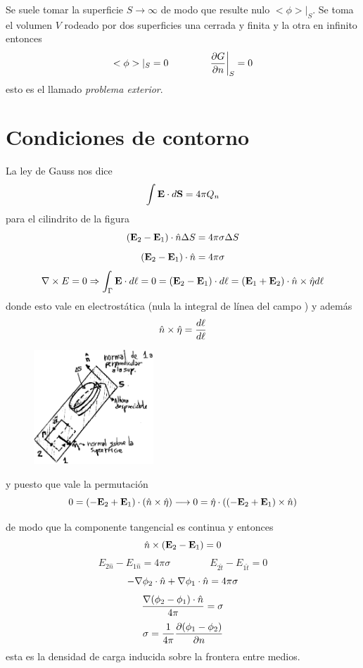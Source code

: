 \documentclass[10pt,oneside]{CBFT_book}
\begin{document}
Se suele tomar la superficie $S \to \infty$ de modo que resulte nulo $<\phi>|_S$.
Se toma el volumen $V$ rodeado por dos superficies una cerrada y finita y la otra
en infinito entonces
\[
	<\phi>|_S = 0 \qquad \qquad \left. \frac{\partial^{\hspace{-0.05em}} {G}}{\partial {n}^{\hspace{-0.05em}}}\right|_S = 0
\]
esto es el llamado {\it problema exterior}.

\section{Condiciones de contorno}

La ley de Gauss nos dice
\[
	\int \vb{E} \cdot d\vb{S} = 4 \pi Q_n
\]
para el cilindrito de la figura
\[
	( \vb{E}_2 - \vb{E}_1 )\cdot \hat{n} \Delta S = 4 \pi \sigma \Delta S 
\]
\[
	( \vb{E}_2 - \vb{E}_1 )\cdot \hat{n} = 4 \pi \sigma 
\]
\[
	\rotorm{E} = 0 \Rightarrow \int_\Gamma \vb{E} \cdot d\vb{\ell} = 0 =
	( \vb{E}_2 - \vb{E}_1 )\cdot d\vb{\ell}  = ( \vb{E}_1 + \vb{E}_2 ) \cdot \hat{n}\times\hat{\eta} d\ell
\]
donde esto vale en electrostática (nula la integral de línea del campo ) y además
\[
	\hat{n}\times\hat{\eta} = \frac{d\vb{\ell}}{d\ell} 
\]

\begin{figure}[htb]
	\begin{center}
	\includegraphics[width=0.4\textwidth]{images/fig_ft1_contorno1.pdf}	 
	\end{center}
	\caption{}
\end{figure} 
y puesto que vale la permutación
\[
	0 = ( -\vb{E}_2 + \vb{E}_1 )\cdot(\hat{n}\times\hat{\eta}) \longrightarrow 
	0 = \hat{\eta} \cdot ( ( -\vb{E}_2 + \vb{E}_1 ) \times \hat{n} )
\]

de modo que la componente tangencial es continua y entonces
\[
	\hat{n} \times ( \vb{E}_2 - \vb{E}_1 ) = 0
\]
\[
	E_{2\hat{n}} - E_{1\hat{n}} = 4 \pi \sigma \qquad \qquad E_{2\hat{t}} -E_{1\hat{t}} = 0
\]
\[
	-\mathbf{\nabla}\phi_2\cdot\hat{n} + \mathbf{\nabla}\phi_1\cdot\hat{n} = 4 \pi \sigma
\]
\[
	\frac{\mathbf{\nabla}(\phi_2-\phi_1)\cdot \hat{n}}{4 \pi} = \sigma
\]
\[
	\sigma = \frac{1}{4\pi}\frac{\partial^{\hspace{-0.05em}} {(\phi_1-\phi_2)}}{\partial {n}^{\hspace{-0.05em}}}
\]
esta es la densidad de carga inducida sobre la frontera entre medios.
\end{document}
